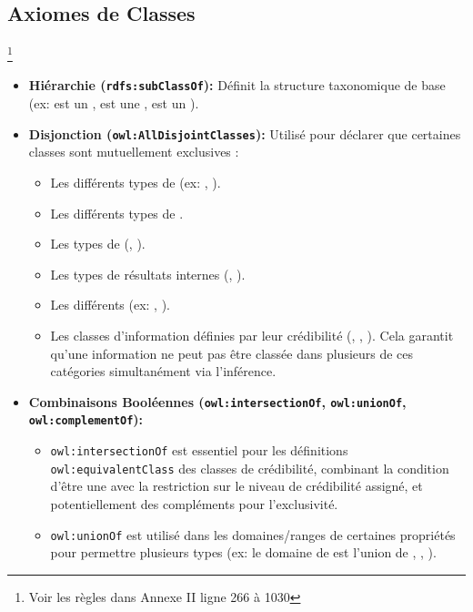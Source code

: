 \documentclass[9pt,twocolumn,twoside,french]{article}
\begin{document}
\subsection{Axiomes de Classes} \footnote{Voir les règles dans Annexe II ligne 266 à 1030}
\begin{itemize}
    \item \textbf{Hiérarchie (\texttt{rdfs:subClassOf}):} Définit la structure taxonomique de base (ex:  est un ,  est une ,  est un ).
    \item \textbf{Disjonction (\texttt{owl:AllDisjointClasses}):} Utilisé pour déclarer que certaines classes sont mutuellement exclusives :
        \begin{itemize}
            \item Les différents types de  (ex: , ).
            \item Les différents types de .
            \item Les types de  (, ).
            \item Les types de résultats internes (, ).
            \item Les différents  (ex: , ).
            \item Les classes d'information définies par leur crédibilité (, , ). Cela garantit qu'une information ne peut pas être classée dans plusieurs de ces catégories simultanément via l'inférence.
        \end{itemize}
    \item \textbf{Combinaisons Booléennes (\texttt{owl:intersectionOf}, \texttt{owl:unionOf}, \texttt{owl:complementOf}):}
        \begin{itemize}
            \item \texttt{owl:intersectionOf} est essentiel pour les définitions \texttt{owl:equivalentClass} des classes de crédibilité, combinant la condition d'être une  avec la restriction sur le niveau de crédibilité assigné, et potentiellement des compléments pour l'exclusivité.
            \item \texttt{owl:unionOf} est utilisé dans les domaines/ranges de certaines propriétés pour permettre plusieurs types (ex: le domaine de  est l'union de , , ).

\end{itemize}
\end{itemize}
\end{document}

